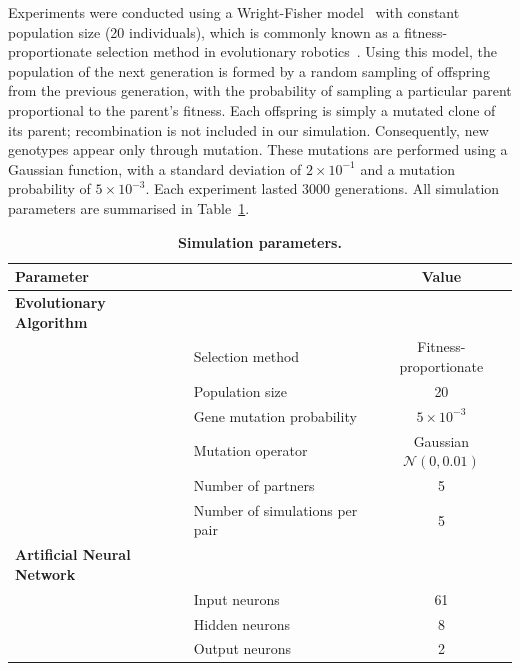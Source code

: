       Experiments were conducted using a Wright-Fisher model~\cite{Wright1931} with constant population size (20 individuals), which is commonly known as a fitness-proportionate selection method in evolutionary robotics~\cite{Eiben2003}. Using this model, the population of the next generation is formed by a random sampling of offspring from the previous generation, with the probability of sampling a particular parent proportional to the parent's fitness. Each offspring is simply a mutated clone of its parent; recombination is not included in our simulation. Consequently, new genotypes appear only through mutation. These mutations are performed using a Gaussian function, with a standard deviation of \(2 \times 10^{-1}\) and a mutation probability of \(5 \times 10^{-3}\). Each experiment lasted 3000 generations. All simulation parameters are summarised in Table~\ref{table:tableParameters}.

      \begin{table}[ht]
        \centering
          \caption{\textbf{Simulation parameters.}}
          \begin{tabular}{|l|l|c|}
            \hline
            \multicolumn{2}{|l|}{\textbf{Parameter}} & \textbf{Value} \\
            \hline
            \textbf{Evolutionary Algorithm} & & \\
            \hline
            & Selection method & Fitness-proportionate \\
            \hline
            & Population size & 20 \\
            \hline
            & Gene mutation probability & \(5 \times 10^{-3}\) \\
            \hline
            & Mutation operator & Gaussian \(\mathcal{N}(0, 0.01)\) \\
            \hline
            & Number of partners & 5 \\
            \hline
            & Number of simulations per pair & 5 \\
            \hline

            \textbf{Artificial Neural Network} & & \\
            \hline
            & Input neurons & 61 \\
            \hline
            & Hidden neurons & 8 \\
            \hline
            & Output neurons & 2 \\
            \hline
          \end{tabular}
        \label{table:tableParameters}
      \end{table}

